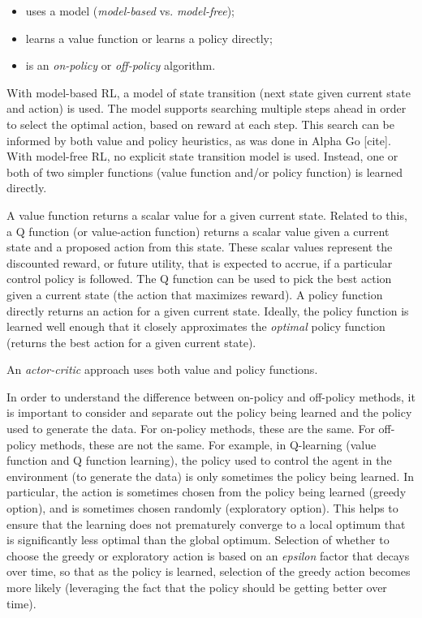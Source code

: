 \documentclass[acmlarge,screen]{acmart}
\begin{document}
\begin{itemize}
\item uses a model (\textit{model-based} vs. \textit{model-free});
\item learns a value function or learns a policy directly;
\item is an \textit{on-policy} or \textit{off-policy} algorithm.
\end{itemize}

With model-based RL, a model of state transition (next state given current state
and action) is used.  The model supports searching multiple steps ahead in order to select the optimal action,
based on reward at each step.
This search can be informed by both value and policy heuristics, as was done in Alpha Go [cite].
With model-free RL, no explicit state transition model is used.
Instead, one or both of two simpler functions (value function and/or policy function) is learned directly.

A value function returns a scalar value for a given current state.  Related to this, a Q function (or value-action function)
returns a scalar value given a current state and a proposed action from this state.  
These scalar values represent the discounted reward, or future utility, that is expected to accrue, if a particular control
policy is followed.  The Q function can be used to pick the best action given a current state (the action that maximizes reward).
A policy function directly returns an action for a given current state.
Ideally, the policy function is learned well enough that it closely approximates the \textit{optimal} policy function
(returns the best action for a given current state).

An \textit{actor-critic} approach uses both value and policy functions.

In order to understand the difference between on-policy and off-policy methods, it is important to consider and separate out
the policy being learned and the policy used to generate the data.
For on-policy methods, these are the same.
For off-policy methods, these are not the same.
For example, in Q-learning (value function and Q function learning), the policy used to control the agent in the environment
(to generate the data) is only sometimes the policy being learned.  
In particular, the action is sometimes chosen from the policy being learned (greedy option), and is sometimes chosen randomly
(exploratory option).  
This helps to ensure that the learning does not prematurely converge to a local optimum that is significantly less optimal
than the global optimum.
Selection of whether to choose the greedy or exploratory action is based on an \textit{epsilon} factor that decays over time, 
so that as the policy is learned, selection of the greedy action becomes more likely
(leveraging the fact that the policy should be getting better over time).
\end{document}
